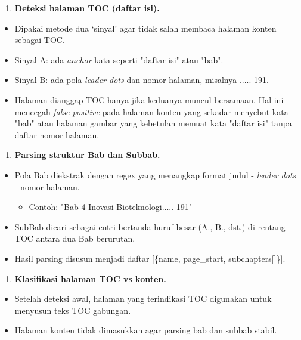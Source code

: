 \documentclass[
]{article}
\begin{document}
\begin{enumerate}
\def\labelenumi{\arabic{enumi}.}
\setcounter{enumi}{1}
\item
  \textbf{Deteksi halaman TOC (daftar isi).}
\end{enumerate}

\begin{itemize}
\item
  Dipakai metode dua `sinyal' agar tidak salah membaca halaman konten
  sebagai TOC.
\item
  Sinyal A: ada \emph{anchor} kata seperti "daftar isi" atau "bab".
\item
  Sinyal B: ada pola \emph{leader dots} dan nomor halaman, misalnya
  ..... 191.
\item
  Halaman dianggap TOC hanya jika keduanya muncul bersamaan. Hal ini
  mencegah \emph{false positive} pada halaman konten yang sekadar
  menyebut kata "bab" atau halaman gambar yang kebetulan memuat kata
  "daftar isi" tanpa daftar nomor halaman.
\end{itemize}

\begin{enumerate}
\def\labelenumi{\arabic{enumi}.}
\setcounter{enumi}{2}
\item
  \textbf{Parsing struktur Bab dan Subbab.}
\end{enumerate}

\begin{itemize}
\item
  Pola Bab diekstrak dengan regex yang menangkap format judul -
  \emph{leader dots} - nomor halaman.

  \begin{itemize}
  \item
    Contoh: "Bab 4 Inovasi Bioteknologi..... 191"
  \end{itemize}
\item
  SubBab dicari sebagai entri bertanda huruf besar (A., B., dst.) di
  rentang TOC antara dua Bab berurutan.
\item
  Hasil parsing disusun menjadi daftar {[}\{name, page\_start,
  subchapters{[}{]}\}{]}.
\end{itemize}

\begin{enumerate}
\def\labelenumi{\arabic{enumi}.}
\setcounter{enumi}{3}
\item
  \textbf{Klasifikasi halaman TOC vs konten.}
\end{enumerate}

\begin{itemize}
\item
  Setelah deteksi awal, halaman yang terindikasi TOC digunakan untuk
  menyusun teks TOC gabungan.
\item
  Halaman konten tidak dimasukkan agar parsing bab dan subbab stabil.
\end{itemize}
\end{document}
